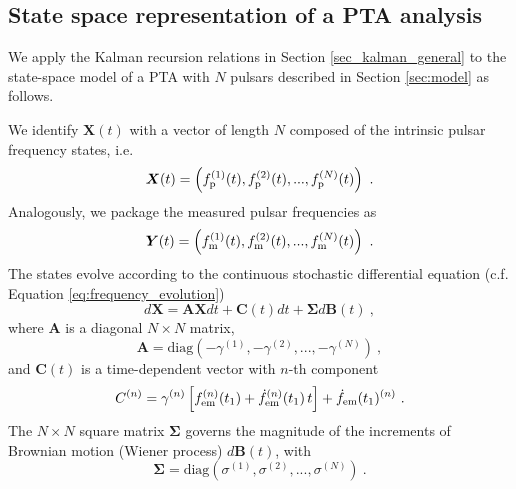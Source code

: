 \documentclass[fleqn,usenatbib,useAMS]{mnras}
\begin{document}
\subsection{State space representation of a PTA analysis}\label{sec_kalman_specific}
We apply the Kalman recursion relations in Section \ref{sec_kalman_general} to the state-space model of a PTA with $N$ pulsars described in Section \ref{sec:model} as follows. \newline 


We identify $\boldsymbol{X}(t)$ with a vector of length $N$ composed of the intrinsic pulsar frequency states, i.e. 
\begin{equation}
	\boldsymbol{X}(t) = \left(f_{\rm p}^{(1)}(t), f_{\rm p}^{(2)}(t), ..., f_{\rm p}^{(N)}(t)\right) \ .
\end{equation}
Analogously,  we package the measured pulsar frequencies as
\begin{equation}
	\boldsymbol{Y}(t) = \left(f_{\rm m}^{(1)}(t), f_{\rm m}^{(2)}(t), ..., f_{\rm m}^{(N)}(t) \right) \ .
\end{equation}
The states evolve according to the continuous stochastic differential equation (c.f. Equation \eqref{eq:frequency_evolution})
\begin{equation}
	d \boldsymbol{X} = \boldsymbol{A} \boldsymbol{X} dt + \boldsymbol{C}(t) dt + \boldsymbol{\Sigma} d \boldsymbol{B}(t) \ , \label{eq:kalmn2}
\end{equation}
where $\boldsymbol{A}$ is a diagonal $N \times N$ matrix,
\begin{equation}
	\boldsymbol{A} = \text{diag} \left(-\gamma^{(1)}, -\gamma^{(2)}, ..., -\gamma^{(N)}\right) \ ,
\end{equation}
and $\boldsymbol{C}(t)$ is a time-dependent vector with $n$-th component
\begin{equation}
	C^{(n)} =\gamma^{(n)} \left[ f^{(n)} _{\rm em} (t_1) + \dot{f}^{(n)} _{\rm em}(t_1) \, t \right] +  \dot{f}_{\rm em}(t_1)^{(n)} \ .
\end{equation}
The $N \times N$ square matrix $\boldsymbol{\Sigma}$  governs the magnitude of the increments of Brownian motion (Wiener process) $d\boldsymbol{B}(t)$, with
\begin{equation}
	\boldsymbol{\Sigma} = \text{diag} \left(\sigma^{(1)}, \sigma^{(2)}, ..., \sigma^{(N)}\right) \ .
\end{equation}
\end{document}
